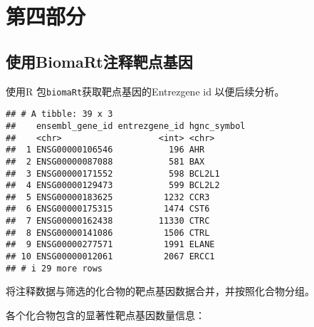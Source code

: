 \documentclass[
]{article}
\begin{document}
\hypertarget{ux7b2cux56dbux90e8ux5206}{%
\section{第四部分}\label{ux7b2cux56dbux90e8ux5206}}

\hypertarget{ux4f7fux7528biomartux6ce8ux91caux9776ux70b9ux57faux56e0}{%
\subsection{使用BiomaRt注释靶点基因}\label{ux4f7fux7528biomartux6ce8ux91caux9776ux70b9ux57faux56e0}}

使用R 包\texttt{biomaRt}获取靶点基因的Entrezgene id 以便后续分析。

\begin{verbatim}
## # A tibble: 39 x 3
##    ensembl_gene_id entrezgene_id hgnc_symbol
##    <chr>                   <int> <chr>      
##  1 ENSG00000106546           196 AHR        
##  2 ENSG00000087088           581 BAX        
##  3 ENSG00000171552           598 BCL2L1     
##  4 ENSG00000129473           599 BCL2L2     
##  5 ENSG00000183625          1232 CCR3       
##  6 ENSG00000175315          1474 CST6       
##  7 ENSG00000162438         11330 CTRC       
##  8 ENSG00000141086          1506 CTRL       
##  9 ENSG00000277571          1991 ELANE      
## 10 ENSG00000012061          2067 ERCC1      
## # i 29 more rows
\end{verbatim}

将注释数据与筛选的化合物的靶点基因数据合并，并按照化合物分组。

各个化合物包含的显著性靶点基因数量信息：
\end{document}
